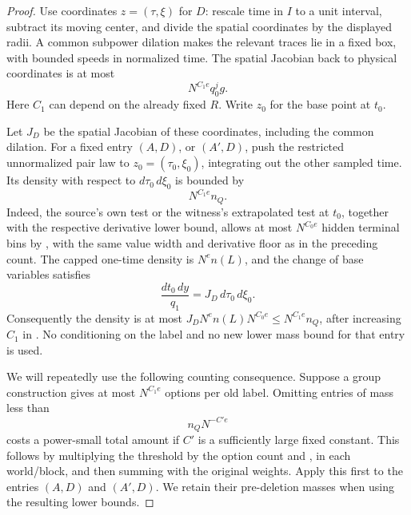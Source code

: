 \begin{proof}
Use coordinates \(z=(\tau,\xi)\) for \(D\): rescale time in \(I\)
to a unit interval, subtract its moving center, and divide the
spatial coordinates by the displayed radii.  A common subpower
dilation makes the relevant traces lie in a fixed box, with
bounded speeds in normalized time.  The spatial Jacobian back
to physical coordinates is at most
\begin{equation}
 N^{C_1e}q_0^jg.
 \label{a02:coarse-jacobian}
\end{equation}
Here \(C_1\) can depend on the already fixed \(R\).
Write \(z_0\) for the base point at \(t_0\).

Let \(J_D\) be the spatial Jacobian of these coordinates, including
the common dilation.  For a fixed entry \((A,D)\), or
\((A',D)\), push the restricted unnormalized pair law to
\(z_0=(\tau_0,\xi_0)\), integrating out the other sampled time.
Its density with respect to \(d\tau_0\,d\xi_0\) is bounded by
\begin{equation}
 N^{C_1e}n_Q.
 \label{a02:source-base-density}
\end{equation}
Indeed, the source's own test or the witness's extrapolated test
at \(t_0\), together with the respective derivative lower bound,
allows at most \(N^{C_0e}\) hidden terminal bins by
, with the same value width and
derivative floor as in the preceding count.  The capped
one-time density is \(N^en(L)\), and
the change of base variables satisfies
\[
 \frac{dt_0\,dy}{q_1}
   =J_D\,d\tau_0\,d\xi_0.
\]
Consequently the density is at most
\(J_DN^en(L)N^{C_0e}\le N^{C_1e}n_Q\), after increasing
\(C_1\) in .  No conditioning on the
label and no new lower mass bound for that entry is used.

We will repeatedly use the following counting consequence.
Suppose a group construction gives at most \(N^{C_1e}\)
options per old label.  Omitting entries of mass less than
\[
 n_QN^{-C'e}
\]
costs a power-small total amount if \(C'\) is a sufficiently
large fixed constant.  This follows by multiplying the
threshold by the option count and ,
in each world/block, and then summing with the original
weights.  Apply this first to the entries \((A,D)\) and
\((A',D)\).  We retain their pre-deletion masses when using
the resulting lower bounds.


\end{proof}
